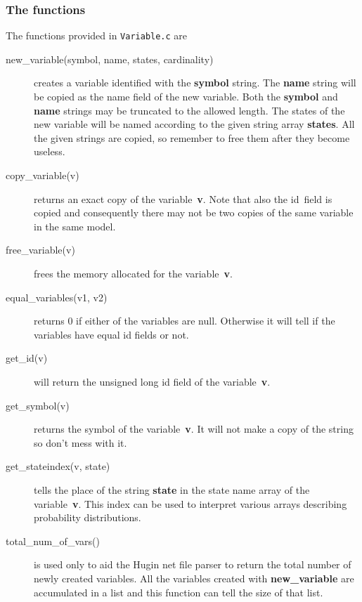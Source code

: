 \documentclass[12pt,a4paper]{report}
\begin{document}

\begin{description}

\end{description}


\subsubsection{The functions}
The functions provided in \verb+Variable.c+ are
\begin{description}
\item[new_variable(symbol, name, states, cardinality)] creates a
variable identified with the \textbf{symbol} string. The \textbf{name} 
string will be copied as the name field of the new variable. Both the 
\textbf{symbol} and \textbf{name} strings may be truncated to the 
allowed length. The states of the new variable will be named according 
to the given string array \textbf{states}. All the given strings are 
copied, so remember to free them after they become useless.

\item[copy_variable(v)] returns an exact copy of the
variable~\textbf{v}. Note that also the id~field is copied and 
consequently there may not be two copies of the same variable in the 
same model.

\item[free_variable(v)] frees the memory allocated for the
variable~\textbf{v}. 

\item[equal_variables(v1, v2)] returns 0 if either of the variables
are null. Otherwise it will tell if the variables have equal id fields
or not.

\item[get_id(v)] will return the unsigned long id field of the 
variable~\textbf{v}.

\item[get_symbol(v)] returns the symbol of the variable~\textbf{v}. It
will not make a copy of the string so don't mess with it.

\item[get_stateindex(v, state)] tells the place of the string
\textbf{state} in the state name array of the
variable~\textbf{v}. This index can be used to interpret various
arrays describing probability distributions. 

\item[total_num_of_vars()] is used only to aid the Hugin net file
parser to return the total number of newly created variables. All 
the variables created with \textbf{new_variable} are accumulated 
in a list and this function can tell the size of that list.


\end{description}
\end{document}
